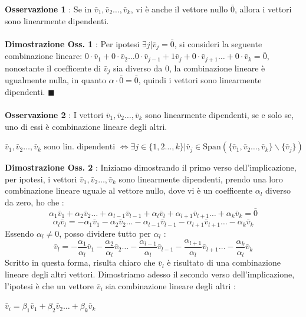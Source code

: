 \documentclass[12pt, letterpaper]{article}
\newcommand{\acc}{\\\hphantom{}\\}
\newcommand{\Span}{{\text{Span}}}
\begin{document}
 \textbf{Osservazione 1} : Se in \(\bar v_1,\bar v_2\dots,\bar v_k\), vi è anche il 
 vettore nullo \(\bar 0\), allora i vettori sono linearmente dipendenti.\acc 
 \textbf{Dimostrazione Oss. 1} : Per ipotesi \(\exists j | \bar v_j = \bar 0\), si consideri la seguente 
 combinazione lineare: \(0\cdot\bar v_1+0\cdot\bar v_2\dots 0\cdot\bar v_{j-1}+1\bar v_j + 0\cdot\bar v_{j+1}\dots +  0\cdot\bar v_{k}=\bar 0\), nonostante 
 il coefficente di \(\bar v_j\) sia diverso da 0, la combinazione lineare è ugualmente nulla, in quanto \(\alpha \cdot \bar 0=\bar 0\), quindi i 
 vettori sono linearmente dipendenti. \(\blacksquare\) \acc
 \textbf{Osservazione 2} : I vettori \(\bar v_1,\bar v_2\dots,\bar v_k\) sono linearmente dipendenti, 
 se e solo se, uno di essi è combinazione lineare degli altri.\begin{center}
    \(\bar v_1,\bar v_2\dots,\bar v_k\text{ sono lin. dipendenti }\iff \exists j\in \{1,2\dots,k\}|\bar v_j \in \Span(\{\bar v_1,\bar v_2\dots,\bar v_k\}\backslash \{\bar v_j\})\)
 \end{center} 
 \textbf{Dimostrazione Oss. 2} : Iniziamo dimostrando il primo verso dell'implicazione, per ipotesi, 
 i vettori \(\bar v_1,\bar v_2\dots,\bar v_k\) sono linearmente dipendenti, prendo una loro combinazione 
 lineare uguale al vettore nullo, dove vi è un coefficente \(\alpha_l\) diverso da zero, ho che :
 \begin{equation}
    \alpha_1\bar v_1+\alpha_2\bar v_2\dots +\alpha_{l-1}\bar v_{l-1}+\alpha_l\bar v_{l}+\alpha_{l+1}\bar v_{l+1}\dots+\alpha_k\bar v_{k}=\bar 0
 \end{equation}
 \begin{equation}
    \alpha_l\bar v_{l}=-\alpha_1\bar v_1-\alpha_2\bar v_2\dots -\alpha_{l-1}\bar v_{l-1}-\alpha_{l+1}\bar v_{l+1}\dots-\alpha_k\bar v_{k}
 \end{equation}
 Essendo \(\alpha_l\ne 0\), posso dividere tutto per \(\alpha_l\) : 
 \begin{equation}
    \bar v_{l}=-\dfrac{\alpha_1}{\alpha_l}\bar v_1-\dfrac{\alpha_2}{\alpha_l}\bar v_2\dots -\dfrac{\alpha_{l-1}}{\alpha_l}\bar v_{l-1}-\dfrac{\alpha_{l+1}}{\alpha_l}\bar v_{l+1}\dots-\dfrac{\alpha_{k}}{\alpha_l}\bar v_{k}
 \end{equation}
 Scritto in questa forma, risulta chiaro che \(\bar v_l\) è risultato di una combinazione lineare degli altri vettori. 
 Dimostriamo adesso il secondo verso dell'implicazione, l'ipotesi è che un vettore \(\bar v_i\) sia 
 combinazione lineare degli altri : \begin{center}
    \(\bar v_i = \beta_1\bar v_1+\beta_2\bar v_2\dots+\beta_k\bar v_k\)
 \end{center}
\end{document}
